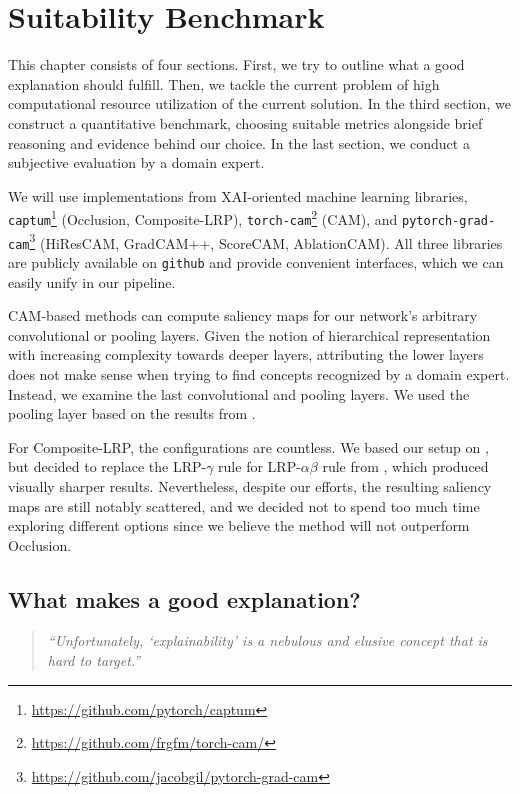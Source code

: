 \chapter{Suitability Benchmark}\label{experiment}

This chapter consists of four sections. First, we try to outline what a good explanation should fulfill. Then, we tackle the current problem of high computational resource utilization of the current solution. In the third section, we construct a quantitative benchmark, choosing suitable metrics alongside brief reasoning and evidence behind our choice. In the last section, we conduct a subjective evaluation by a domain expert.

We will use implementations from XAI-oriented machine learning libraries, \texttt{captum}\footnote{\url{https://github.com/pytorch/captum}} (Occlusion, Composite-LRP), \texttt{torch-cam}\footnote{\url{https://github.com/frgfm/torch-cam/}} (CAM), and \texttt{pytorch-grad-cam}\footnote{\url{https://github.com/jacobgil/pytorch-grad-cam}} (HiResCAM, GradCAM++, ScoreCAM, AblationCAM). All three libraries are publicly available on \texttt{github} and provide convenient interfaces, which we can easily unify in our pipeline.

CAM-based methods can compute saliency maps for our network's arbitrary convolutional or pooling layers.
Given the notion of hierarchical representation with increasing complexity towards deeper layers, attributing the lower layers does not make sense when trying to find concepts recognized by a domain expert.
Instead, we examine the last convolutional and pooling layers.
We used the pooling layer based on the results from .

For Composite-LRP, the configurations are countless. We based our setup on , but decided to replace the LRP-$\gamma$ rule for LRP-$\alpha\beta$ rule from \cite{lrp-alpha-beta}, which produced visually sharper results.
Nevertheless, despite our efforts, the resulting saliency maps are still notably scattered, and we decided not to spend too much time exploring different options since we believe the method will not outperform Occlusion.

\section{What makes a good explanation?}

\begin{quote}
    \emph{``Unfortunately, `explainability' is a nebulous and elusive concept that is hard to target.''} \cite{explainability-hard}
\end{quote}

